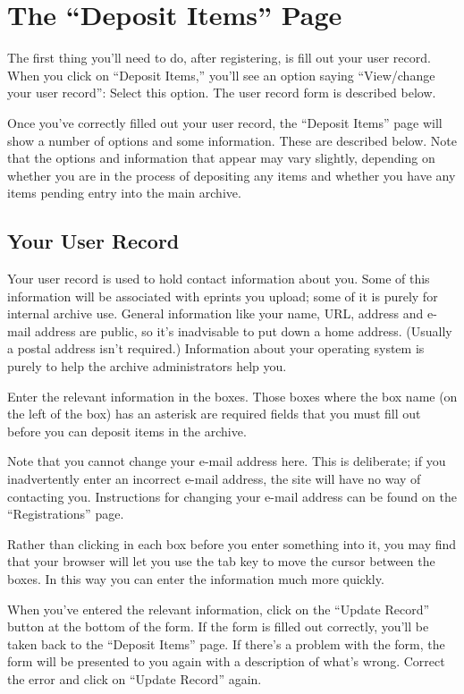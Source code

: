 \section{The ``Deposit Items'' Page}


The first thing you'll need to do, after registering, is fill out your user record.  When you click on ``Deposit Items,'' you'll see an option saying ``View/change your user record'': Select this option. The user record form is described below.

Once you've correctly filled out your user record, the ``Deposit Items'' page will show a number of options and some information. These are described below. Note that the options and information that appear may vary slightly, depending on whether you are in the process of depositing any items and whether you have any items pending entry into the main archive.


\subsection{Your User Record}

Your user record is used to hold contact information about you. Some of this information will be associated with eprints you upload; some of it is purely for internal archive use. General information like your name, URL, address and e-mail address are public, so it's inadvisable to put down a home address. (Usually a postal address isn't required.) Information about your operating system is purely to help the archive administrators help you.

Enter the relevant information in the boxes. Those boxes where the box name (on the left of the box) has an asterisk are required fields that you must fill out before you can deposit items in the archive.

Note that you cannot change your e-mail address here. This is deliberate; if you inadvertently enter an incorrect e-mail address, the site will have no way of contacting you. Instructions for changing your e-mail address can be found on the ``Registrations'' page.

Rather than clicking in each box before you enter something into it, you may find that your browser will let you use the tab key to move the cursor between the boxes. In this way you can enter the information much more quickly.

When you've entered the relevant information, click on the ``Update Record'' button at the bottom of the form. If the form is filled out correctly, you'll be taken back to the ``Deposit Items'' page. If there's a problem with the form, the form will be presented to you again with a description of what's wrong. Correct the error and click on ``Update Record'' again.


